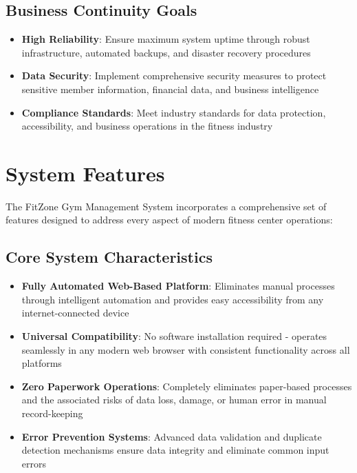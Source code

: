\documentclass[12pt,a4paper]{report}
\begin{document}
\subsection{Business Continuity Goals}

\begin{itemize}[leftmargin=*]
    \item \textbf{High Reliability}: Ensure maximum system uptime through robust infrastructure, automated backups, and disaster recovery procedures
    \item \textbf{Data Security}: Implement comprehensive security measures to protect sensitive member information, financial data, and business intelligence
    \item \textbf{Compliance Standards}: Meet industry standards for data protection, accessibility, and business operations in the fitness industry
\end{itemize}

\section{System Features}
\label{sec:system-features}

The FitZone Gym Management System incorporates a comprehensive set of features designed to address every aspect of modern fitness center operations:

\subsection{Core System Characteristics}

\begin{itemize}[leftmargin=*]
    \item \textbf{Fully Automated Web-Based Platform}: Eliminates manual processes through intelligent automation and provides easy accessibility from any internet-connected device
    \item \textbf{Universal Compatibility}: No software installation required - operates seamlessly in any modern web browser with consistent functionality across all platforms
    \item \textbf{Zero Paperwork Operations}: Completely eliminates paper-based processes and the associated risks of data loss, damage, or human error in manual record-keeping
    \item \textbf{Error Prevention Systems}: Advanced data validation and duplicate detection mechanisms ensure data integrity and eliminate common input errors
\end{itemize}
\end{document}
